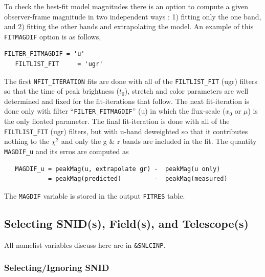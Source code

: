 \documentclass[12pt]{article}
\begin{document}
To check the best-fit model magnitudes there is an 
option to compute a given observer-frame magnitude 
in two independent ways : 1) fitting only the one band,
and 2) fitting the other bands and extrapolating the
model.  An example of this {\tt FITMAGDIF} option is
as follows,
%
\begin{Verbatim}[frame=single]
   FILTER_FITMAGDIF = 'u'
   FILTLIST_FIT     = 'ugr'
\end{Verbatim}
%
The first {\tt NFIT\_ITERATION} fits are done with
all of the {\tt FILTLIST\_FIT} (ugr) filters so that
the time of peak brightness ($t_0$), stretch and color
parameters are well determined and fixed for the fit-iterations
that follow.  The next fit-iteration is done only
with filter ``{\tt FILTER\_FITMAGDIF}'' (u) in which
the flux-scale ($x_0$ or $\mu$) is the only floated parameter.
The final fit-iteration is done with all of the
{\tt FILTLIST\_FIT} (ugr) filters, but with u-band 
deweighted so that it contributes nothing to the $\chi^2$
and only the g \& r bands are included in the fit.
The quantity {\tt MAGDIF\_u} and its erros are computed as
\begin{verbatim}
   MAGDIF_u = peakMag(u, extrapolate gr) -  peakMag(u only) 
            = peakMag(predicted)         -  peakMag(measured)
\end{verbatim}
The {\tt MAGDIF} variable is stored in the output {\tt FITRES} table.

   \clearpage
   \subsection{Selecting SNID(s), Field(s), and Telescope(s) }
   \label{subsec:select}

All namelist variables discuss here are in {\tt \&SNLCINP}.


\subsubsection{Selecting/Ignoring SNID}
\label{sss:select_SNID}
\end{document}

